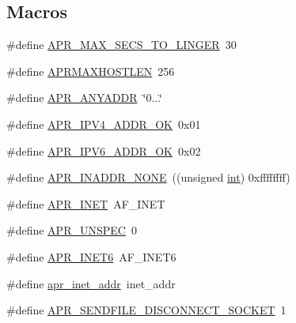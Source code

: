 \subsection*{Macros}
\begin{DoxyCompactItemize}
\item 
\#define \hyperlink{group__apr__network__io_ga8311c84f6946742188a6b9a45e92ea8e}{A\+P\+R\+\_\+\+M\+A\+X\+\_\+\+S\+E\+C\+S\+\_\+\+T\+O\+\_\+\+L\+I\+N\+G\+ER}~30
\item 
\#define \hyperlink{group__apr__network__io_ga7f5b3882209106bb407b1d518d6ad59d}{A\+P\+R\+M\+A\+X\+H\+O\+S\+T\+L\+EN}~256
\item 
\#define \hyperlink{group__apr__network__io_gadce1131c46b897ec63e9e4316a4631dd}{A\+P\+R\+\_\+\+A\+N\+Y\+A\+D\+DR}~\char`\"{}0...\char`\"{}
\item 
\#define \hyperlink{group__apr__network__io_ga58aa30a94127b4a80f27fbf2e03fdfd8}{A\+P\+R\+\_\+\+I\+P\+V4\+\_\+\+A\+D\+D\+R\+\_\+\+OK}~0x01
\item 
\#define \hyperlink{group__apr__network__io_gaef1f70f9b969d25832a230f429837207}{A\+P\+R\+\_\+\+I\+P\+V6\+\_\+\+A\+D\+D\+R\+\_\+\+OK}~0x02
\item 
\#define \hyperlink{group__apr__network__io_ga16eb7ee55ff87a5093f2114ea5351217}{A\+P\+R\+\_\+\+I\+N\+A\+D\+D\+R\+\_\+\+N\+O\+NE}~((unsigned \hyperlink{pcre_8txt_a42dfa4ff673c82d8efe7144098fbc198}{int}) 0xffffffff)
\item 
\#define \hyperlink{group__apr__network__io_gaa96e8e8dbf92bc77643a4032017b3d67}{A\+P\+R\+\_\+\+I\+N\+ET}~A\+F\+\_\+\+I\+N\+ET
\item 
\#define \hyperlink{group__apr__network__io_gaa7a33b17a7d0820b09ef489bd3328f85}{A\+P\+R\+\_\+\+U\+N\+S\+P\+EC}~0
\item 
\#define \hyperlink{group__apr__network__io_gad09d9ea8995f50f35073ae0c77efb44f}{A\+P\+R\+\_\+\+I\+N\+E\+T6}~A\+F\+\_\+\+I\+N\+E\+T6
\item 
\#define \hyperlink{group__apr__network__io_ga46a8b06887871cfd60a3e37385775e22}{apr\+\_\+inet\+\_\+addr}~inet\+\_\+addr
\item 
\#define \hyperlink{group__apr__network__io_gaca378d0e24b1588e3fdb143e4ea9090d}{A\+P\+R\+\_\+\+S\+E\+N\+D\+F\+I\+L\+E\+\_\+\+D\+I\+S\+C\+O\+N\+N\+E\+C\+T\+\_\+\+S\+O\+C\+K\+ET}~1
\end{DoxyCompactItemize}
